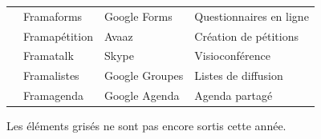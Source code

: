 \documentclass[10pt,a4paper, twoside]{report}
\begin{document}
{\begin{tabular}{|c|l|l|l|}
		\cline{2-4}
		& \cellcolor{lightgray}Framaforms & \cellcolor{lightgray}Google Forms & \cellcolor{lightgray}Questionnaires en ligne \\
		\cline{2-4}
		& \cellcolor{lightgray}Framapétition & \cellcolor{lightgray}Avaaz & \cellcolor{lightgray}Création de pétitions \\
		\cline{2-4}
		& \cellcolor{lightgray}Framatalk & \cellcolor{lightgray}Skype & \cellcolor{lightgray}Visioconférence \\
		\cline{2-4}
		& \cellcolor{lightgray}Framalistes & \cellcolor{lightgray}Google Groupes & \cellcolor{lightgray}Listes de diffusion \\
		\cline{2-4}
		& \cellcolor{lightgray}Framagenda & \cellcolor{lightgray}Google Agenda & \cellcolor{lightgray}Agenda partagé \\
		\hline 
		\end{tabular}}
	\vspace{1cm}
	Les éléments grisés ne sont pas encore sortis cette année.
	\thispagestyle{empty}
	\newpage\null\thispagestyle{empty}\newpage
\end{document}
